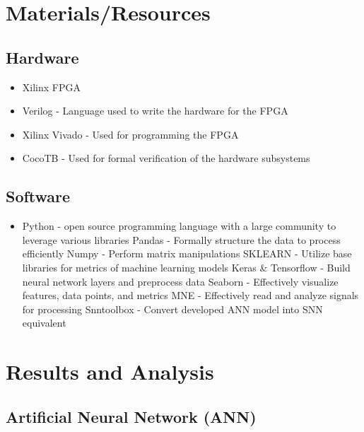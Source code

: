 \documentclass[12pt,titlepage]{article}
\begin{document}
\section{Materials/Resources}
\subsection{Hardware}
\begin{itemize}
	\item Xilinx FPGA
	\item Verilog - Language used to write the hardware for the FPGA
	\item Xilinx Vivado - Used for programming the FPGA
	\item CocoTB - Used for formal verification of the hardware subsystems
\end{itemize}	

\subsection{Software}
\begin{itemize}
	\item Python - open source programming language with a large community to leverage various libraries
		\subitem Pandas - Formally structure the data to process efficiently
		\subitem Numpy - Perform matrix manipulations 
		\subitem SKLEARN - Utilize base libraries for metrics of machine learning models
		\subitem Keras \& Tensorflow - Build neural network layers and preprocess data
		\subitem Seaborn - Effectively visualize features, data points, and metrics
		\subitem MNE - Effectively read and analyze signals for processing
		\subitem Snntoolbox - Convert developed ANN model into SNN equivalent
\end{itemize}	

\section{Results and Analysis}
\subsection{Artificial Neural Network (ANN)}
\end{document}
